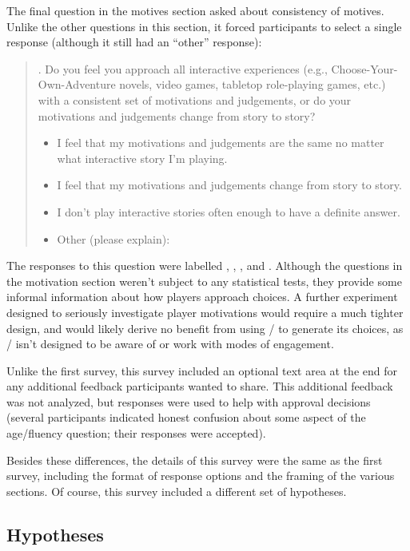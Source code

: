 The final question in the motives section asked about consistency of motives.
%
Unlike the other questions in this section, it forced participants to select a single response (although it still had an ``other'' response):
%
\begin{quote}
  . Do you feel you approach all interactive experiences (e.g., Choose-Your-Own-Adventure novels, video games, tabletop role-playing games, etc.) with a consistent set of motivations and judgements, or do your motivations and judgements change from story to story?
  \begin{itemize}
    \item[\ding{109}] I feel that my motivations and judgements are the same no matter what interactive story I'm playing.
    \item[\ding{109}] I feel that my motivations and judgements change from story to story.
    \item[\ding{109}] I don't play interactive stories often enough to have a definite answer.
    \item[\ding{109}] Other (please explain):
  \end{itemize}
\end{quote}
%
The responses to this question were labelled , , , and .
%
Although the questions in the motivation section weren't subject to any statistical tests, they provide some informal information about how players approach choices.
%
A further experiment designed to seriously investigate player motivations would require a much tighter design, and would likely derive no benefit from using \dunyazad/ to generate its choices, as \dunyazad/ isn't designed to be aware of or work with modes of engagement.


Unlike the first survey, this survey included an optional text area at the end for any additional feedback participants wanted to share.
%
This additional feedback was not analyzed, but responses were used to help with approval decisions (several participants indicated honest confusion about some aspect of the age/fluency question; their responses were accepted).


Besides these differences, the details of this survey were the same as the first survey, including the format of response options and the framing of the various sections.
%
Of course, this survey included a different set of hypotheses.

\subsection{Hypotheses}


